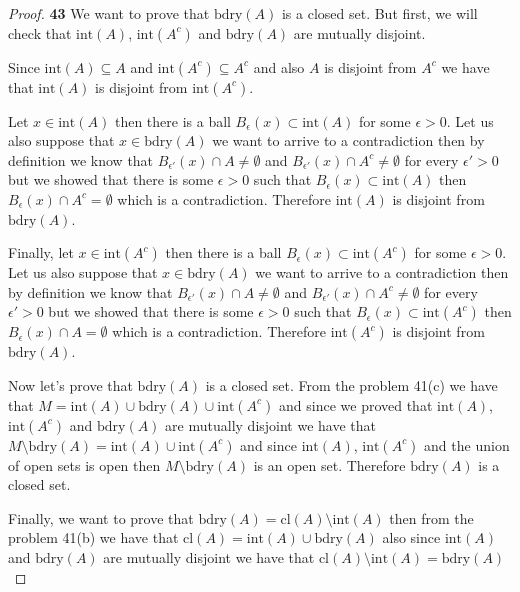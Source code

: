 \documentclass[11pt]{article}
\newcommand{\cl}{\text{cl}}
\newcommand{\bdry}{\text{bdry}}
\newcommand{\inter}{\text{int}}
\theoremstyle{definition}
\begin{document}
    \begin{proof}{\textbf{43}}
        We want to prove that $\bdry(A)$ is a closed set.
        But first, we will
        check that $\inter(A)$, $\inter(A^c)$ and $\bdry(A)$ are mutually
        disjoint.

        Since $\inter(A) \subseteq A$ and $\inter(A^c) \subseteq A^c$ and also
        $A$ is disjoint from $A^c$ we have that $\inter(A)$ is disjoint from
        $\inter(A^c)$.

        Let $x \in \inter(A)$ then there is a ball
        $B_{\epsilon}(x) \subset \inter(A)$ for some $\epsilon > 0$. Let us also
        suppose that $x \in \bdry(A)$ we want to arrive to a contradiction then
        by definition we know that  $B_{\epsilon'}(x) \cap A \neq \emptyset$ and
        $B_{\epsilon'}(x) \cap A^c \neq \emptyset$ for every $\epsilon' > 0$ but
        we showed that there is some $\epsilon > 0$ such that
        $B_{\epsilon}(x) \subset \inter(A)$
        then $B_{\epsilon}(x) \cap A^c = \emptyset$ which is a contradiction.
        Therefore $\inter(A)$ is disjoint from $\bdry(A)$.
        
        Finally, let $x \in \inter(A^c)$ then there is
        a ball $B_{\epsilon}(x) \subset \inter(A^c)$ for some $\epsilon > 0$.
        Let us also suppose that $x \in \bdry(A)$ we want to arrive to a
        contradiction then by definition we know that
        $B_{\epsilon'}(x) \cap A \neq \emptyset$ and
        $B_{\epsilon'}(x) \cap A^c \neq \emptyset$ for every $\epsilon' > 0$ but
        we showed that there is some $\epsilon > 0$ such that
        $B_{\epsilon}(x) \subset \inter(A^c)$
        then $B_{\epsilon}(x) \cap A = \emptyset$ which is a contradiction.
        Therefore $\inter(A^c)$ is disjoint from $\bdry(A)$.

        Now let's prove that $\bdry(A)$ is a closed set. From the problem 41(c)
        we have that $M = \inter(A) \cup \bdry(A) \cup \inter(A^c)$ and since we
        proved that $\inter(A)$, $\inter(A^c)$ and $\bdry(A)$ are mutually
        disjoint we have that $M \setminus \bdry(A) = \inter(A) \cup \inter(A^c)$
        and since $\inter(A)$, $\inter(A^c)$ and the union of open sets is open
        then $M \setminus \bdry(A)$ is an open set. Therefore $\bdry(A)$ is
        a closed set.

        Finally, we want to prove that $\bdry(A) = \cl(A) \setminus \inter(A)$
        then from the problem 41(b) we have that
        $\cl(A) = \inter(A) \cup \bdry(A)$ also since $\inter(A)$ and $\bdry(A)$
        are mutually disjoint  we have that
        $\cl(A) \setminus \inter(A) = \bdry(A)$
    \end{proof}
\end{document}
